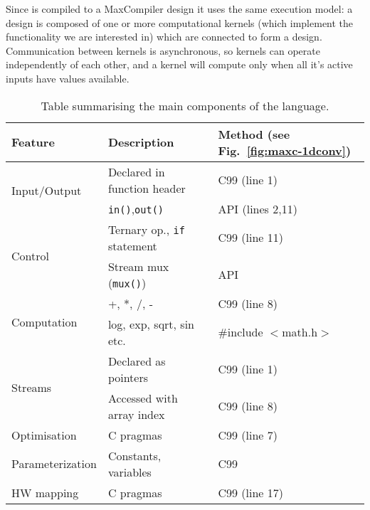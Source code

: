 Since \MAXC{} is compiled to a MaxCompiler design it uses the same
execution model: a design is composed of one or more computational
kernels (which implement the functionality we are interested in) which
are connected to form a design. Communication between kernels is
asynchronous, so kernels can operate independently of each other, and
a kernel will compute only when all it's active inputs have values
available.

\begin{table}[!h]
  \centering
\renewcommand{\arraystretch}{1.2}
\caption{Table summarising the main components of the \MAXC{} language.}
\label{table:maxc-features}
\begin{tabular}{l|l|l}
\hline
\bf{Feature}                   & \bf{Description}                   & \bf{Method (see Fig.~\ref{fig:maxc-1dconv})} \\
\hline\hline
  \multirow{2}{*}{Input/Output}         & Declared in function header          & C99 (line 1)                                 \\\cline{2-3}       & \texttt{in()},\texttt{out()}  & \MAXC{} API (lines 2,11) \\
\hline
  \multirow{2}{*}{Control}     & Ternary op., \texttt{if} statement & C99 (line 11)                                \\\cline{2-3}      & Stream mux (\texttt{mux()})       & \MAXC{} API  \\
\hline
\multirow{2}{*}{Computation} & +, *, /, -                         & C99 (line 8)                           \\\cline{2-3} & log, exp, sqrt, sin etc.  & \#include $<$math.h$>$  \\
\hline
  \multirow{2}{*}{Streams}     & Declared as pointers               & C99 (line 1)                                 \\\cline{2-3}       & Accessed with array index & C99 (line 8) \\
\hline
  Optimisation                 & C pragmas                   & C99 (line 7)                                 \\
\hline
  Parameterization             & Constants, variables                   & C99                                          \\
\hline
HW mapping                  & C pragmas                   & C99 (line 17)                                \\
\end{tabular}
\end{table}

